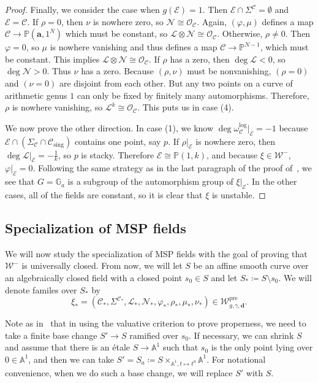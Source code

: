 \documentclass{amsart}
\theoremstyle{definition}
\theoremstyle{remark}
\theoremstyle{plain}
\theoremstyle{definition}
\theoremstyle{remark}
\newcommand{\A}{\mathbb{A}}
\newcommand{\G}{\mathbb{G}}
\renewcommand{\P}{\mathbb{P}}
\newcommand{\ba}{\mathbf{a}}
\newcommand{\mc}[1]{\mathcal{#1}}
\newcommand{\mbf}[1]{\mathbf{#1}}
\newcommand{\mr}[1]{\mathrm{#1}}
\newcommand{\1}{\mathbf{1}}
\newcommand{\2}{\mathbf{2}}
\newcommand{\3}{\mathbf{3}}
\newcommand{\pre}{\mr{pre}}
\begin{document}
\begin{proof}
    Finally, we consider the case when $g(\mc{E}) = 1$. Then $\mc{E} \cap \Sigma^{\mc{C}} = \emptyset$ and $\mc{E} = \mc{C}$. If $\rho = 0$, then $\nu$ is nowhere zero, so $\mc{N} \cong \mc{O}_{\mc{C}}$. Again, $(\varphi,\mu)$ defines a map $\mc{C} \to \P(\ba,1^N)$ which must be constant, so $\mc{L} \otimes \mc{N} \cong \mc{O}_{\mc{C}}$. Otherwise, $\rho \neq 0$. Then $\varphi = 0$, so $\mu$ is nowhere vanishing and thus defines a map $\mc{C} \to \P^{N-1}$, which must be constant. This implies $\mc{L} \otimes \mc{N} \cong \mc{O}_{\mc{C}}$. If $\rho$ has a zero, then $\deg \mc{L} < 0$, so $\deg \mc{N} > 0$. Thus $\nu$ has a zero. Because $(\rho,\nu)$ must be nonvanishing, $(\rho = 0)$ and $(\nu = 0)$ are disjoint from each other. But any two points on a curve of arithmetic genus $1$ can only be fixed by finitely many automorphisms. Therefore, $\rho$ is nowhere vanishing, so $\mc{L}^k \cong \mc{O}_{\mc{C}}$. This puts us in case (4).

    We now prove the other direction. In case (1), we know $\deg \omega^{\log}_{\mc{C}}|_{\mc{E}} = -1$ because $\mc{E} \cap (\Sigma_{\mc{C}} \cap \mc{C}_{\mr{sing}})$ contains one point, say $p$. If $\rho|_{\mc{E}}$ is nowhere zero, then $\deg \mc{L}|_{\mc{E}} = -\frac{1}{k}$, so $p$ is stacky. Therefore $\mc{E} \cong \P(1,k)$, and because $\xi \in \mc{W}^-$, $\varphi|_{\mc{E}} = 0$. Following the same strategy as in the last paragraph of the proof of~\cite[Lemma 3.3]{mspfermat}, we see that $G = \G_a$ is a subgroup of the automorphism group of $\xi|_{\mc{E}}$. In the other cases, all of the fields are constant, so it is clear that $\xi$ is unstable.
\end{proof}

\subsection{Specialization of MSP fields}
\label{sub:specialization}

We will now study the specialization of MSP fields with the goal of proving that $\mc{W}^-$ is universally closed. From now, we will let $S$ be an affine smooth curve over an algebraically closed field with a closed point $s_0 \in S$ and let $S_* \coloneqq S \setminus s_0$. We will denote familes over $S_*$ by 
\[ \xi_* = (\mc{C}_*,\Sigma^{\mc{C}_*},\mc{L}_*,\mc{N}_*,\varphi_*,\rho_*,\mu_*,\nu_*) \in \mc{W}^{\pre}_{g,\gamma,\mbf{d}}. \]

Note as in~\cite[\href{https://stacks.math.columbia.edu/tag/0CL9}{Tag 0CL9}]{stacks-project} that in using the valuative criterion to prove properness, we need to take a finite base change $S' \to S$ ramified over $s_0$. If necessary, we can shrink $S$ and assume that there is an \'etale $S \to \A^1$ such that $s_0$ is the only point lying over $0 \in \A^1$, and then we can take $S' = S_a \coloneqq S \times_{\A^1,t \mapsto t^a} \A^1$. For notational convenience, when we do such a base change, we will replace $S'$ with $S$.
\end{document}
